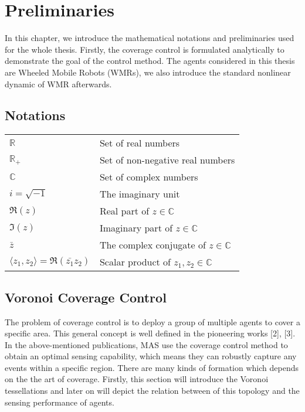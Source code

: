 
\chapter{Preliminaries}\label{chapter:introduction}
In this chapter, we introduce the mathematical notations and preliminaries used for the whole thesis. Firstly, the coverage control is formulated analytically to demonstrate the goal of the control method. The agents considered in this thesis are Wheeled Mobile Robots (WMRs), we also introduce the standard nonlinear dynamic of WMR afterwards. 

\section{Notations}
\begin{tabular}{ l l }
	${\mathbb{R}}$ & Set of real numbers  \\
	${\mathbb{R}_+}$ & Set of non-negative real numbers  \\
	${\mathbb{C}}$ & Set of complex numbers \\
	${i = \sqrt{-1}}$ & The imaginary unit \\
	${\Re (z)}$ & Real part of ${z \in \mathbb{C}}$ \\
	${\Im (z)}$ & Imaginary part of ${z \in \mathbb{C}}$ \\
	${\bar{z}}$ & The complex conjugate of ${z \in \mathbb{C}}$ \\
	${\langle z_1,z_2  \rangle = \Re(\bar{z_1}z_2)}$ & Scalar product of ${z_1, z_2 \in \mathbb{C}}$ \\
\end{tabular}
\section{Voronoi Coverage Control}
The problem of coverage control is to deploy a group of multiple agents to cover a specific area. This general concept is well defined in the pioneering works [2], [3]. In the above-mentioned publications, MAS use the coverage control method to obtain an optimal sensing capability, which means they can robustly capture any events within a specific region. There are many kinds of formation which depends on the the art of coverage. Firstly, this section will introduce the Voronoi tessellations and later on will depict the relation between of this topology and the sensing performance of agents.

